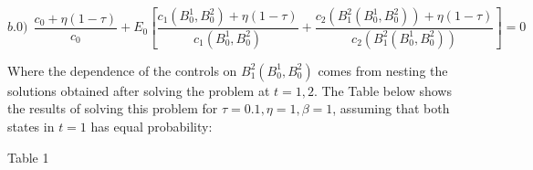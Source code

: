 \documentclass[11pt,letterpaper]{article}
\begin{document}
\bigskip

\begin{equation*}
b.0) \ \  \frac{c_0+\eta (1-\tau )}{c_0}+E_0\left[ \frac{c_1({B}^{1}_{0},{B}^{2}_{0})+\eta (1-\tau )}{c_1({B}^{1}_{0},{B}^{2}_{0})}+\frac{c_2( B^{2}_{1}({B}^{1}_{0},{B}^{2}_{0}))+\eta (1-\tau )}{c_2( B^{2}_{1}({B}^{1}_{0},{B}^{2}_{0}))} \right]=0
\end{equation*}



\bigskip

Where the dependence of the controls on $ B^{2}_{1}({B}^{1}_{0},{B}^{2}_{0})$ comes from nesting the solutions obtained after solving the problem at $t=1,2$. The Table below shows the results of solving this problem for $\tau=0.1,\eta=1, \beta=1$, assuming that both states in $t=1$ has equal probability:

\bigskip

\begin{center}
Table 1
\end{center}
\end{document}
